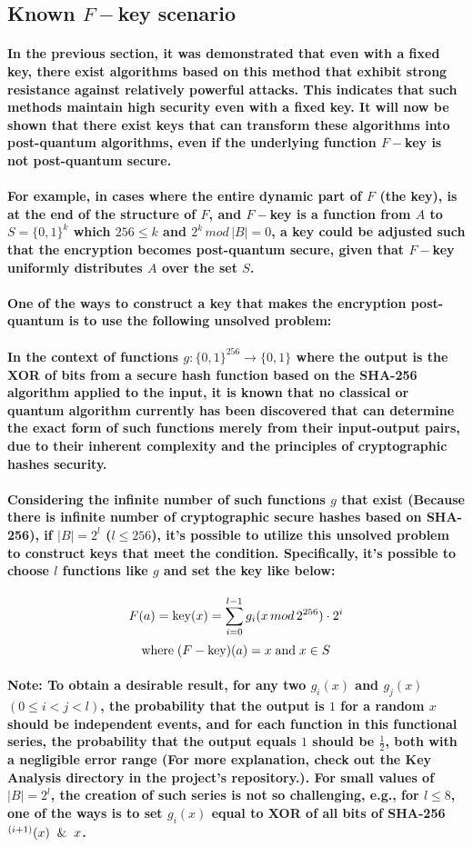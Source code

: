 \documentclass[oneside]{book}
\newcommand{\myparagraph}[1]{\paragraph{\textnormal{#1}}}
\begin{document}
\newpage

\subsection{Known $F-$key scenario}

\myparagraph{
In the previous section, it was demonstrated that even with a fixed key, there exist algorithms based on this method that exhibit strong resistance against relatively powerful attacks. This indicates that such methods maintain high security even with a fixed key. It will now be shown that there exist keys that can transform these algorithms into post-quantum algorithms, even if the underlying function $F-$key is not post-quantum secure.
}

\myparagraph{
For example, in cases where the entire dynamic part of $F$ (the key), is at the end of the structure of $F$, and $F-$key is a function from $A$ to $S = \{0, 1\}^k$ which $256 \le k$ and $2^k \, mod \, |B| = 0$, a key could be adjusted such that the encryption becomes post-quantum secure, given that $F-$key uniformly distributes $A$ over the set $S$.
}

\myparagraph{
\textbf{One of the ways to construct a key that makes the encryption post-quantum is to use the following unsolved problem:}
}

\myparagraph{
In the context of functions $g: \{0, 1\}^{256} \rightarrow \{0, 1\}$ where the output is the XOR of bits from a secure hash function based on the SHA-256 algorithm applied to the input, it is known that no classical or quantum algorithm currently has been discovered that can determine the exact form of such functions merely from their input-output pairs, due to their inherent complexity and the principles of cryptographic hashes security.
}

\myparagraph{
Considering the infinite number of such functions $g$ that exist (Because there is infinite number of cryptographic secure hashes based on SHA-256), if $|B| = 2 ^ l$ ($l \le 256$), it's possible to utilize this unsolved problem to construct keys that meet the condition. Specifically, it's possible to choose $l$ functions like $g$ and set the key like below:
}

$$F(a) = \textnormal{key}(x) = \sum_{i=0}^{l-1} g_i(x\, mod \, 2^{256}) \cdot 2 ^ i $$
$$ \text{where} \; (F - \text{key})(a) = x \; \textnormal{and} \; x \in S$$

\myparagraph{
\textbf{Note:} To obtain a desirable result, for any two $g_i(x)$ and $g_j(x)$ $(0 \le i  < j < l)$, the probability that the output is $1$ for a random $x$ should be independent events, and for each function in this functional series, the probability that the output equals $1$ should be $\frac{1}{2}$, both with a negligible error range (For more explanation, check out the \textbf{Key Analysis} directory in the project's repository.). For small values of $|B| = 2^l$, the creation of such series is not so challenging, e.g., for $l \le 8$, one of the ways is to set $g_i(x)$ equal to XOR of all bits of SHA-256$^{(i+1)}(x) \And x$.
}
\end{document}
